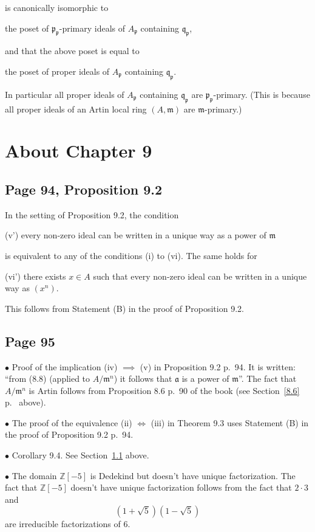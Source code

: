 \documentclass[parskip=half,fontsize=12pt]{scrartcl}%
\newcommand{\mf}{\mathfrak}
\newcommand{\aaa}{\mf a}
\newcommand{\mmm}{\mf m}
\newcommand{\ppp}{\mf p}
\newcommand{\qqq}{\mf q}
\newcommand{\bu}{\bullet}
\begin{document}
is canonically isomorphic to 

\qquad the poset of $\ppp_\ppp$-primary ideals of $A_\ppp$ containing $\qqq_\ppp$, 

and that the above poset is equal to 

\qquad the poset of proper ideals of $A_\ppp$ containing $\qqq_\ppp$. 

In particular all proper ideals of $A_\ppp$ containing $\qqq_\ppp$ are $\ppp_\ppp$-primary. (This is because all proper ideals of an Artin local ring $(A,\mmm)$ are $\mmm$-primary.)

\section{About Chapter 9}%

\subsection{Page 94, Proposition 9.2}\label{92}%

In the setting of Proposition 9.2, the condition

(v') every non-zero ideal can be written in a unique way as a power of $\mmm$

is equivalent to any of the conditions (i) to (vi). The same holds for

(vi') there exists $x\in A$ such that every non-zero ideal can be written in a unique way as $(x^n)$.

This follows from Statement (B) in the proof of Proposition 9.2.

\subsection{Page 95}%

$\bu$ Proof of the implication (iv) $\implies$ (v) in Proposition 9.2 p.~94. It is written: ``from (8.8) (applied to $A/\mmm^n$) it follows that $\aaa$ is a power of $\mmm$''. The fact that $A/\mmm^n$ is Artin follows from Proposition 8.6 p.~90 of the book (see Section~\ref{8.6} p.~\pageref{8.6} above). %

$\bu$ The proof of the equivalence (ii) $\iff$ (iii) in Theorem 9.3 uses Statement (B) in the proof of Proposition 9.2 p.~94.

$\bu$ Corollary 9.4. See Section~\ref{92} above.

$\bu$ The domain $\mathbb Z[-5]$ is Dedekind but doesn't have unique factorization. %
The fact that $\mathbb Z[-5]$ doesn't have unique factorization follows from the fact that $2\cdot3$ and $$\left(1+\sqrt5\right)\left(1-\sqrt5\right)$$ are irreducible factorizations of $6$.%
\end{document}
